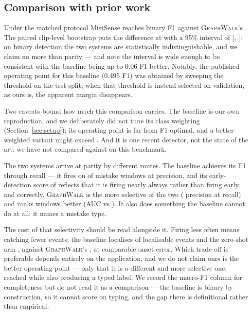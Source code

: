 \documentclass[10pt,twocolumn]{article}
\newcommand{\ourmodel}{\textsc{GraphWalk}}
\begin{document}
\subsection{Comparison with prior work}
\label{sec:baseline}

Under the matched protocol MistSense reaches \baseF{} binary F1 against
\ourmodel{}'s \resF{}. The paired clip-level bootstrap puts the difference at
\baseDelta{} with a 95\% interval of [\baseDeltaLo{}, \baseDeltaHi{}]: on
binary detection the two systems are statistically indistinguishable, and we
claim no more than parity --- and note the interval is wide enough to be
consistent with the baseline being up to 0.06 F1 better. Notably, the published
operating point for this baseline (0.495 F1) was obtained by sweeping the
threshold on the test split; when that threshold is instead selected on
validation, as ours is, the apparent margin disappears.

Two caveats bound how much this comparison carries. The baseline is our own
reproduction, and we deliberately did not tune its class weighting
(Section~\ref{sec:setup}); its operating point is far from F1-optimal, and a
better-weighted variant might exceed \resF{}. And it is one recent detector, not
the state of the art: we have not compared against
\citet{lee2026estanet,flaborea2024prego,lee2024egoper} on this benchmark.

The two systems arrive at parity by different routes. The baseline achieves its
F1 through recall --- it fires on \baseR{} of mistake windows at \baseP{}
precision, and its early-detection score of \baseEDS{} reflects that it is
firing nearly always rather than firing early and correctly. \ourmodel{} is the
more selective of the two (\resP{} precision at \resR{} recall) and ranks
windows better (AUC \resAUC{} vs \baseAUC{}). It also does something the
baseline cannot do at all: it names a mistake type.

The cost of that selectivity should be read alongside it. Firing less often
means catching fewer events: the baseline localises \baseDet{} of \resLoc{}
localisable events and the zero-shot arm \zsDet{}, against \ourmodel{}'s
\resDet{}, at comparable onset error. Which trade-off is preferable depends
entirely on the application, and we do not claim ours is the better operating
point --- only that it is a different and more selective one, reached while also
producing a typed label. We record
the macro-F1 column for completeness but do not read it as a comparison --- the
baseline is binary by construction, so it cannot score on typing, and the gap
there is definitional rather than empirical.
\end{document}
